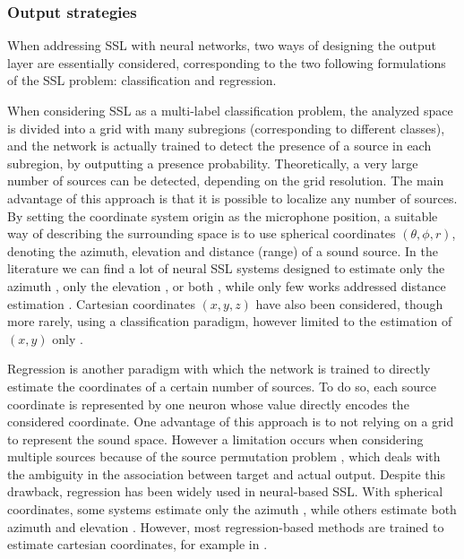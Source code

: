 \subsubsection{Output strategies}
\label{ss:outputScheme}

When addressing SSL with neural networks, two ways of designing the output layer are essentially considered, corresponding to the two following formulations of the SSL problem: classification and regression. 

When considering SSL as a multi-label classification problem, the analyzed space is divided into a grid with many subregions (corresponding to different classes), and the network is actually trained to detect the presence of a source in each subregion, by outputting a presence probability. Theoretically, a very large number of sources can be detected, depending on the grid resolution. The main advantage of this approach is that it is possible to localize any number of sources. By setting the coordinate system origin as the microphone position, a suitable way of describing the surrounding space is to use spherical coordinates $(\theta,\phi,r)$, denoting the azimuth, elevation and distance (range) of a sound source. In the literature we can find a lot of neural SSL systems designed to estimate only the azimuth \cite{roden_sound_2015,hirvonen_classication_2015,suvorov_deep_2018,vecchiotti_end--end_2019,xiao_learning-based_2015,chazan_multi-microphone_2019}, only the elevation \cite{thuillier_spatial_2018}, or both \cite{perotin_crnn-based_2018,perotin_crnn-based_2019,adavanne_localization_2019}, while only few works addressed distance estimation \cite{roden_sound_2015,bologni_acoustic_2021}. Cartesian coordinates $(x,y,z)$ have also been considered, though more rarely, using a classification paradigm, however limited to the estimation of $(x,y)$ only \cite{moing_learning_2020,ma_phased_2018}.

Regression is another paradigm with which the network is trained to directly estimate the coordinates of a certain number of sources. To do so, each source coordinate is represented by one neuron whose value directly encodes the considered coordinate. One advantage of this approach is to not relying on a grid to represent the sound space. However a limitation occurs when considering multiple sources because of the source permutation problem \cite{subramanian_deep_2021}, which deals with the ambiguity in the association between target and actual output. Despite this drawback, regression has been widely used in neural-based SSL. With spherical coordinates, some systems estimate only the azimuth \cite{nguyen_autonomous_2018,opochinsky_deep_2019}, while others estimate both azimuth and elevation \cite{maruri_gcc-phat_2019,sundar_raw_2020}. However, most regression-based methods are trained to estimate cartesian coordinates, for example in \cite{vera-diaz_towards_2018,krause_comparison_2021,adavanne_localization_2019,comminiello_quaternion_2019}.

